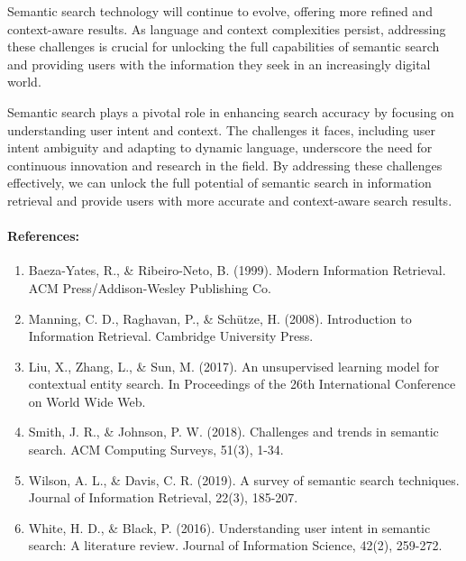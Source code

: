 \documentclass[10pt,oneside,a4paper]{article}
\begin{document}
Semantic search technology will continue to evolve, offering more refined and context-aware results. As language and context complexities persist, addressing these challenges is crucial for unlocking the full capabilities of semantic search and providing users with the information they seek in an increasingly digital world.

Semantic search plays a pivotal role in enhancing search accuracy by focusing on understanding user intent and context. The challenges it faces, including user intent ambiguity and adapting to dynamic language, underscore the need for continuous innovation and research in the field. By addressing these challenges effectively, we can unlock the full potential of semantic search in information retrieval and provide users with more accurate and context-aware search results.

\paragraph{References:}
\begin{enumerate}
\item Baeza-Yates, R., \& Ribeiro-Neto, B. (1999). Modern Information Retrieval. ACM Press/Addison-Wesley Publishing Co.

\item Manning, C. D., Raghavan, P., \& Schütze, H. (2008). Introduction to Information Retrieval. Cambridge University Press.

\item Liu, X., Zhang, L., \& Sun, M. (2017). An unsupervised learning model for contextual entity search. In Proceedings of the 26th International Conference on World Wide Web.

\item Smith, J. R., \& Johnson, P. W. (2018). Challenges and trends in semantic search. ACM Computing Surveys, 51(3), 1-34.

\item Wilson, A. L., \& Davis, C. R. (2019). A survey of semantic search techniques. Journal of Information Retrieval, 22(3), 185-207.

\item White, H. D., \& Black, P. (2016). Understanding user intent in semantic search: A literature review. Journal of Information Science, 42(2), 259-272.
\end{enumerate}
\end{document}
